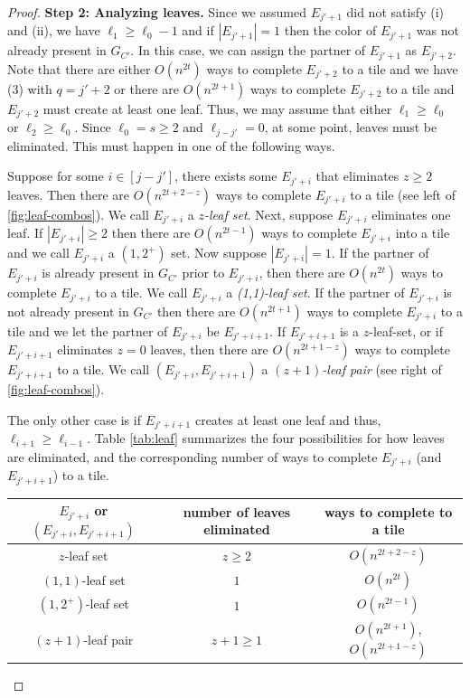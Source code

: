 \documentclass{article}
\theoremstyle{definition}
\begin{document}
\begin{proof}
\medskip



\noindent\textbf{Step 2: Analyzing leaves.} Since we assumed $E_{j'+1}$ did not satisfy (i) and (ii), we have $\ell_1 \geq \ell_0 - 1$ and if $|E_{j'+1}|= 1$ then the color of $E_{j'+1}$ was not already present in $G_{C'}$. In this case, we can assign the partner of $E_{j'+1}$ as $E_{j'+2}$. Note that there are either $O(n^{2t})$ ways to complete $E_{j'+2}$ to a tile and we have (3) with $q=j'+2$ or there are $O(n^{2t+1})$ ways to complete $E_{j'+2}$ to a tile and $E_{j'+2}$ must create at least one leaf. Thus, we may assume that either $\ell_1 \geq \ell_0$ or $\ell_2 \geq \ell_0$. Since $\ell_0 = s \geq 2$ and $\ell_{j-j'} = 0$, at some point, leaves must be eliminated. This must happen in one of the following ways.  

Suppose for some $i\in [j-j']$, there exists some $E_{j'+i}$ that eliminates $z\geq 2$ leaves. Then there are $O(n^{2t+2-z})$ ways to complete $E_{j'+i}$ to a tile (see left of \cref{fig:leaf-combos}). We call $E_{j'+i}$ a \textit{$z$-leaf set}. Next, suppose $E_{j'+i}$ eliminates one leaf. If $|E_{j'+i}|\geq 2$ then there are $O(n^{2t-1})$ ways to complete $E_{j'+i}$ into a tile and we call $E_{j'+i}$ a $(1,2^+)$ set. Now suppose $|E_{j'+i}|=1$. If the partner of $E_{j'+i}$ is already present in $G_{C'}$ prior to $E_{j'+i}$, then there are $O(n^{2t})$ ways to complete $E_{j'+i}$ to a tile. We call $E_{j'+i}$ a \textit{(1,1)-leaf set}. If the partner of $E_{j'+i}$ is not already present in $G_{C'}$ then there are $O(n^{2t+1})$ ways to complete $E_{j'+i}$ to a tile and we let the partner of $E_{j'+i}$ be $E_{j'+i+1}$. If $E_{j'+i+1}$ is a $z$-leaf-set, or if $E_{j'+i+1}$ eliminates $z=0$ leaves, then there are $O(n^{2t+1-z})$ ways to complete $E_{j'+i+1}$ to a tile. We call $(E_{j'+i},E_{j'+i+1})$ a \textit{$(z+1)$-leaf pair} (see right of \cref{fig:leaf-combos}). 

The only other case is if $
E_{j'+i+1}$ creates at least one leaf and thus, $\ell_{i+1}\geq \ell_{i-1}$. Table \ref{tab:leaf} summarizes the four possibilities for how leaves are eliminated, and the corresponding number of ways to complete $E_{j'+i}$ (and $E_{j'+i+1}$) to a tile.


\begin{table}[h!]
\renewcommand{\arraystretch}{1.5}
    \centering
    \begin{tabular}{|c|c|c|}
       \hline
       $E_{j'+i}$ or $(E_{j'+i},E_{j'+i+1})$ & number of leaves eliminated & ways to complete to a tile  \\
       \hline \hline
       $z$-leaf set & $z\geq 2$ & $O(n^{2t+2-z})$ \\
       \hline
       $(1,1)$-leaf set & $1$ & $O(n^{2t})$ \\
       \hline
       $(1,2^+)$-leaf set & $1$ & $O(n^{2t-1})$ \\
       \hline
       $(z+1)$-leaf pair & $z+1\geq 1$ & $O(n^{2t+1})$, $O(n^{2t+1-z})$\\
       \hline
       

\end{tabular}
\end{table}
\end{proof}
\end{document}
